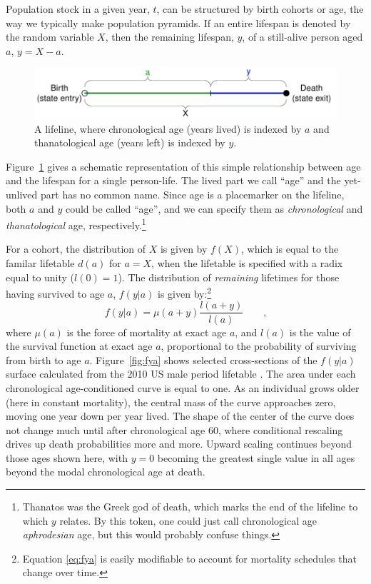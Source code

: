 \documentclass{article}
\newcommand{\tc}{\quad\quad\text{,}}
\begin{document}
Population stock in a
 given year, $t$, can be structured by birth cohorts or age, the way we typically make 
 population pyramids. If an entire lifespan is denoted by the random variable
 $X$, then the remaining lifespan, $y$, of a still-alive person aged $a$, $y = X - a$.
\begin{figure}[h]
\centering
	\caption{A lifeline, where chronological age (years lived) is indexed by $a$
	and thanatological age (years left) is indexed by $y$.}
	\label{fig:line}
	\includegraphics[scale=.8]{Figures/LifeLine.pdf}	
\end{figure}
Figure~\ref{fig:line} gives a schematic representation of this simple
relationship between age and the lifespan for a single person-life. The lived
part we call ``age'' and the yet-unlived part has no common name. Since age is a
placemarker on the lifeline, both $a$ and $y$ could be called ``age'', and we
can specify them as \textit{chronological} and \textit{thanatological} age,
respectively.\footnote{Thanatos was the Greek god of death, which marks the end of the lifeline to which $y$ relates. By this token, one could just call chronological age \textit{aphrodesian} age, but this would probably confuse things.}

For a cohort, the distribution of $X$ is given by $f(X)$, which is equal to the familar lifetable
$d(a)$ for $a = X$, when the lifetable is specified with a radix equal
to unity ($l(0)=1$).
The distribution of \textit{remaining} lifetimes for those having survived to age $a$, $f(y|a)$ is
given by:\footnote{Equation \eqref{eq:fya} is easily modifiable to account for
mortality schedules that change over time.}
\begin{equation}
\label{eq:fya}
f(y|a) = \mu(a+y) \frac{l(a+y)}{l(a)} \tc
\end{equation}
where $\mu(a)$ is the force of mortality at exact age $a$, and $l(a)$ is
the value of the survival function at exact age $a$, proportional to the
probability of surviving from birth to age $a$. Figure~\ref{fig:fya} shows selected
cross-sections of the $f(y|a)$ surface calculated from the 2010 US male period
lifetable . The area under each chronological age-conditioned curve is equal to one.
As an individual grows older (here in constant mortality), the central mass of the
curve approaches zero, moving one year down per year lived. The shape of the center of
the curve does not change much until after chronological age 60, where
conditional rescaling drives up death probabilities more and more. Upward
scaling continues beyond those ages shown here, with $y=0$ becoming the greatest
single value in all ages beyond the modal chronological age at death.
\end{document}
